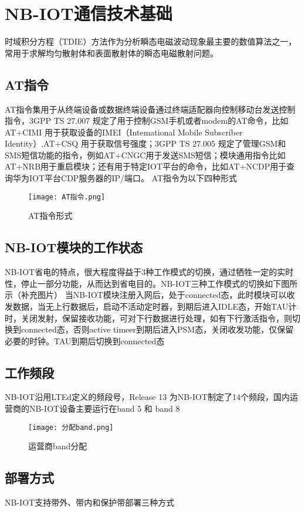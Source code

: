 \chapter{NB-IOT通信技术基础}
时域积分方程（TDIE）方法作为分析瞬态电磁波动现象最主要的数值算法之一，常用于求解均匀散射体和表面散射体的瞬态电磁散射问题。

\section{AT指令}
AT指令集用于从终端设备或数据终端设备通过终端适配器向控制移动台发送控制指令，3GPP TS 27.007 规定了用于控制GSM手机或者modem的AT命令，比如 AT+CIMI 用于获取设备的IMEI（Intemational Mobile Subscriber Identity）,AT+CSQ 用于获取信号强度；3GPP TS 27.005 规定了管理GSM和SMS短信功能的指令，例如AT+CNGC用于发送SMS短信；模块通用指令比如 AT+NRB用于重启模块；还有用于特定IOT平台的命令，比如AT+NCDP用于查询华为IOT平台CDP服务器的IP/端口。
AT指令为以下四种形式

\begin{figure}[h]
	\texttt{[image: AT指令.png]}
	\caption{AT指令形式}
	\label{AT指令}
\end{figure}


\section{NB-IOT模块的工作状态}
NB-IOT省电的特点，很大程度得益于3种工作模式的切换，通过牺牲一定的实时性，停止一部分功能，从而达到省电目的。NB-IOT三种工作模式的切换如下图所示（补充图片）
当NB-IOT模块注册入网后，处于connected态，此时模块可以收发数据，当无上行数据后，启动不活动定时器，到期后进入IDLE态，开始TAU计时，关闭发射，保留接收功能，可对下行数据进行处理，如有下行激活指令，则切换到connected态，否则active timeer到期后进入PSM态，关闭收发功能，仅保留必要的时钟。TAU到期后切换到connected态

\section{工作频段}
NB-IOT沿用LTEd定义的频段号，Release 13 为NB-IOT制定了14个频段，国内运营商的NB-IOT设备主要运行在band 5 和 band 8


\begin{figure}[h]
	\texttt{[image: 分配band.png]}
	\caption{运营商band分配}
	\label{分配band}
\end{figure}


\section{部署方式}
NB-IOT支持带外、带内和保护带部署三种方式

